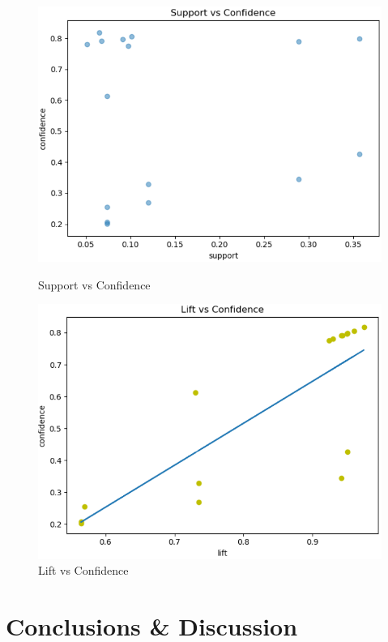 \documentclass[sigconf]{acmart}
\begin{document}
\begin{figure}[H]
\centering
\includegraphics[scale=0.45]{images/support_vs_confidence.png}\\
\caption{Support vs Confidence}
\label{Fig_1} 
\end{figure}

\begin{figure}[H]
\centering
\includegraphics[scale=0.45]{images/lift_vs_confidence.png}
\caption{Lift vs Confidence}
\label{Fig_2} 
\end{figure}


\section{Conclusions \& Discussion}
\end{document}
